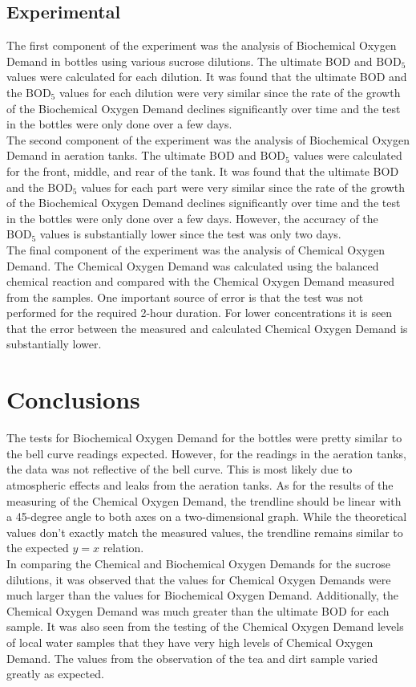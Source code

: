 \documentclass{article}
\begin{document}
    \subsection{Experimental}
    \indent The first component of the experiment was the analysis of Biochemical Oxygen Demand in bottles using various sucrose dilutions. The ultimate BOD and \(\text{BOD}_5\) values were calculated for each dilution. It was found that the ultimate BOD and the \(\text{BOD}_5\) values for each dilution were very similar since the rate of the growth of the Biochemical Oxygen Demand declines significantly over time and the test in the bottles were only done over a few days.\\
    \indent The second component of the experiment was the analysis of Biochemical Oxygen Demand in aeration tanks. The ultimate BOD and \(\text{BOD}_5\) values were calculated for the front, middle, and rear of the tank. It was found that the ultimate BOD and the \(\text{BOD}_5\) values for each part were very similar since the rate of the growth of the Biochemical Oxygen Demand declines significantly over time and the test in the bottles were only done over a few days. However, the accuracy of the \(\text{BOD}_5\) values is substantially lower since the test was only two days.\\
    \indent The final component of the experiment was the analysis of Chemical Oxygen Demand. The Chemical Oxygen Demand was calculated using the balanced chemical reaction and compared with the Chemical Oxygen Demand measured from the samples. One important source of error is that the test was not performed for the required 2-hour duration. For lower concentrations it is seen that the error between the measured and calculated Chemical Oxygen Demand is substantially lower.\\
    \newpage
    \section{Conclusions}
    \indent The tests for Biochemical Oxygen Demand for the bottles were pretty similar to the bell curve readings expected. However, for the readings in the aeration tanks, the data was not reflective of the bell curve. This is most likely due to atmospheric effects and leaks from the aeration tanks. As for the results of the measuring of the Chemical Oxygen Demand, the trendline should be linear with a 45-degree angle to both axes on a two-dimensional graph. While the theoretical values don't exactly match the measured values, the trendline remains similar to the expected \(y=x\) relation.\\
    \indent In comparing the Chemical and Biochemical Oxygen Demands for the sucrose dilutions, it was observed that the values for Chemical Oxygen Demands were much larger than the values for Biochemical Oxygen Demand. Additionally, the Chemical Oxygen Demand was much greater than the ultimate BOD for each sample. It was also seen from the testing of the Chemical Oxygen Demand levels of local water samples that they have very high levels of Chemical Oxygen Demand. The values from the observation of the tea and dirt sample varied greatly as expected.    
    \newpage
\end{document}
